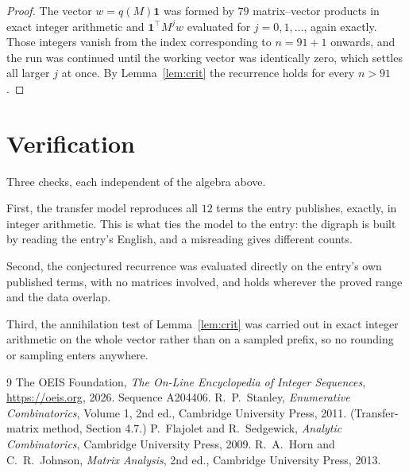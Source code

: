 \documentclass[11pt,a4paper]{article}
\theoremstyle{plain}
\theoremstyle{definition}
\begin{document}
\begin{proof}
The vector $w=q(M)\mathbf{1}$ was formed by $79$ matrix--vector products in exact
integer arithmetic and $\mathbf{1}^{\!\top}M^{j}w$ evaluated for $j=0,1,\dots$, again
exactly. Those integers vanish from the index corresponding to $n=91+1$ onwards, and the
run was continued until the working vector was identically zero, which settles all larger $j$
at once. By Lemma~\ref{lem:crit} the recurrence holds for every $n>91$.
\end{proof}

\section{Verification}

Three checks, each independent of the algebra above.

First, the transfer model reproduces all $12$ terms the entry publishes, exactly, in
integer arithmetic. This is what ties the model to the entry: the digraph is built by reading
the entry's English, and a misreading gives different counts.

Second, the conjectured recurrence was evaluated directly on the entry's own published terms,
with no matrices involved, and holds wherever the proved range and the data overlap.

Third, the annihilation test of Lemma~\ref{lem:crit} was carried out in exact integer
arithmetic on the whole vector rather than on a sampled prefix, so no rounding or sampling
enters anywhere.

\begin{thebibliography}{9}
 The OEIS Foundation, \emph{The On-Line Encyclopedia of Integer
Sequences}, \url{https://oeis.org}, 2026. Sequence A204406.
 R.~P.~Stanley, \emph{Enumerative Combinatorics}, Volume 1, 2nd ed.,
Cambridge University Press, 2011. (Transfer-matrix method, Section 4.7.)
 P.~Flajolet and R.~Sedgewick, \emph{Analytic Combinatorics}, Cambridge
University Press, 2009.
 R.~A.~Horn and C.~R.~Johnson, \emph{Matrix Analysis}, 2nd ed., Cambridge
University Press, 2013.
\end{thebibliography}
\end{document}
